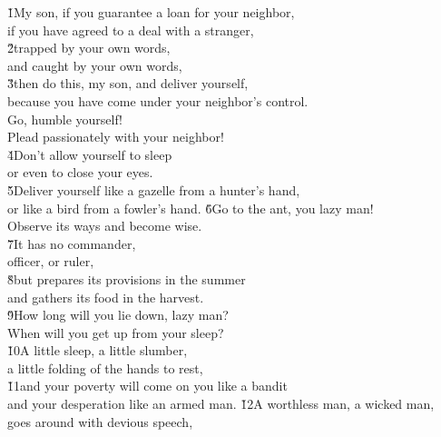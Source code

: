 \begin{poetry}
\poeml {}
\v{1}My son, if you guarantee a loan for your neighbor, \\
\poeml if you have agreed to a deal with a stranger, \\
\poeml \v{2}trapped by your own words, \\
\poemll    and caught by your own words, \\
\poeml \v{3}then do this, my son, and deliver yourself, \\
\poemll    because you have come under your neighbor's control. \\
\poeml Go, humble yourself! \\
\poemll    Plead passionately with your neighbor! \\
\poeml \v{4}Don't allow yourself to sleep \\
\poemll    or even to close your eyes. \\
\poeml \v{5}Deliver yourself like a gazelle from a hunter's hand, \\
\poemll    or like a bird from a fowler's hand.
\poeml \v{6}Go to the ant, you lazy man! \\
\poemll    Observe its ways and become wise. \\
\poeml \v{7}It has no commander, \\
\poemll    officer, or ruler, \\
\poeml \v{8}but prepares its provisions in the summer \\
\poemll    and gathers its food in the harvest. \\
\poeml \v{9}How long will you lie down, lazy man? \\
\poemll    When will you get up from your sleep? \\
\poeml \v{10}A little sleep, a little slumber, \\
\poemll    a little folding of the hands to rest, \\
\poeml \v{11}and your poverty will come on you like a bandit \\
\poemll    and your desperation like an armed man.
\poeml \v{12}A worthless man, a wicked man, \\
\poemll    goes around with devious speech, \\

\end{poetry}
